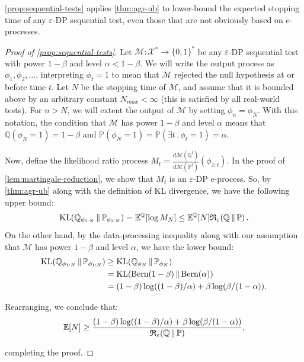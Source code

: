 \documentclass{article}
\DeclareMathOperator{\KLop}{KL}
\newcommand{\KL}[2]{%
  \mathchoice
    {\KLop\!\left(#1\,\middle\|\,#2\right)}%
    {\KLop(#1\,\Vert\,#2)}%
    {\KLop(#1\,\Vert\,#2)}%
    {\KLop(#1\,\Vert\,#2)}%
}
\newcommand{\Rdiv}[3][\eps]{%
  \mathfrak{R}_{#1}\!\left(#2\,\middle\|\,#3\right)%
}
\newcommand{\Null}{\mathbb{P}}
\newcommand{\E}{\mathbb{E}}
\newcommand{\Alt}{\mathbb{Q}}
\newcommand{\M}{\mathcal{M}}
\newcommand{\opt}{\Rdiv{\Alt}{\Null}}
\newcommand{\eps}{\varepsilon}
\begin{document}
\vspace{1cm}

\cref{prop:sequential-tests} applies \cref{thm:agr-ub} to lower-bound the expected stopping time of any $\eps$-DP sequential test, even those that are not obviously based on e-processes.

\begin{proof}[Proof of \cref{prop:sequential-tests}]
    Let $\M: \mathcal{X}^* \to \lbrace 0, 1 \rbrace^*$ be any $\eps$-DP sequential test with power $1-\beta$ and level $\alpha < 1-\beta$. We will write the output process as $\phi_1, \phi_2, \ldots$, interpreting $\phi_t = 1$ to mean that $\M$ rejected the null hypothesis at or before time $t$. Let $N$ be the stopping time of $\M$, and assume that it is bounded above by an arbitrary constant $N_{max} < \infty$ (this is satisfied by all real-world tests). For $n > N$, we will extent the output of $\M$ by setting $\phi_n = \phi_N$. With this notation, the condition that $\M$ has power $1-\beta$ and level $\alpha$ means that $\Alt(\phi_N = 1) = 1-\beta$ and $\Null(\phi_N = 1) = \Null(\exists t\,.\,\phi_t = 1) = \alpha$. 

    Now, define the likelihood ratio process $M_t = \frac{d \M(\Alt^t)}{d\M(\Null^t)}(\phi_{1:t})$. In the proof of \cref{lem:martingale-reduction}, we show that $M_t$ is an $\eps$-DP e-process. So, by \cref{thm:agr-ub} along with the definition of KL divergence, we have the following upper bound:
    \begin{equation*}
        \KL{\Alt_{\phi_{1:N}}}{\Null_{\phi_{1:N}}} = \E^\Alt[\log M_N] \leq \E^\Alt[N] \opt.
    \end{equation*}
    On the other hand, by the data-processing inequality along with our assumption that $\M$ has power $1-\beta$ and level $\alpha$, we have the lower bound:
    \begin{align*}
        \KL{\Alt_{\phi_{1:N}}}{\Null_{\phi_{1:N}}} 
        &\geq \KL{\Alt_{\phi_{N}}}{\Null_{\phi_{N}}} \\
        &= \KL{\text{Bern}(1-\beta)}{\text{Bern}(\alpha)} \\
        &= (1-\beta)\log((1-\beta)/\alpha) + \beta\log(\beta/(1-\alpha)).
    \end{align*}

    Rearranging, we conclude that:
    \begin{equation*}
        \E[N] \geq \frac{(1-\beta)\log((1-\beta)/\alpha) + \beta\log(\beta/(1-\alpha))}{\opt},
    \end{equation*}

    completing the proof. 
    \end{proof}
\end{document}
